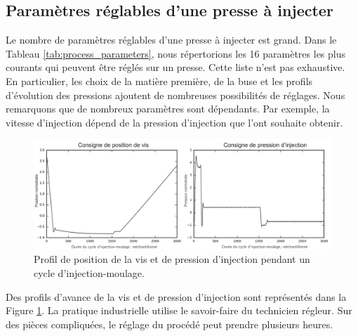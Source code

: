 \subsection{Paramètres réglables d'une presse à injecter} \label{subsec:process_parameters}

Le nombre de paramètres réglables d'une presse à injecter est grand.
Dans le Tableau \ref{tab:process_parameters}, nous répertorions les 16 paramètres les plus courants qui peuvent être réglés sur un presse.
Cette liste n'est pas exhaustive.
En particulier, les choix de la matière première, de la buse et les profils d'évolution des pressions ajoutent de nombreuses possibilités de réglages.
Nous remarquons que de nombreux paramètres sont dépendants.
Par exemple, la vitesse d'injection dépend de la pression d'injection que l'ont souhaite obtenir.

\begin{figure}[bthp]
	\centering
	\includegraphics[width=\textwidth,height=\textheight,keepaspectratio]{../Chap1/Figures/part1_std_signals.png}
	\caption{Profil de position de la vis et de pression d'injection pendant un cycle d'injection-moulage.}
	\label{fig:molding_control}
\end{figure}

Des profils d'avance de la vis et de pression d'injection sont représentés dans la Figure \ref{fig:molding_control}.
La pratique industrielle utilise le savoir-faire du technicien régleur.  %
Sur des pièces compliquées, le réglage du procédé peut prendre plusieurs heures.

